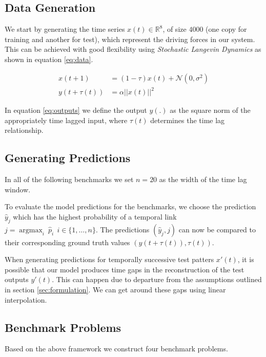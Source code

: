 \documentclass[envcountsect,runningheads]{llncs}
\theoremstyle{etoile}
\DeclareMathOperator*{\argmax}{argmax}
\begin{document}
\subsection{Data Generation}

We start by generating the time series $x(t) \in \mathbb{R}^8$, of size $4000$ 
(one copy for training and another for test), which represent the driving forces in our system. 
This can be achieved with good flexibility using \emph{Stochastic Langevin Dynamics} as shown in 
equation \ref{eq:data}.

\begin{align}
 x(t + 1) &= (1 - \tau) x(t) + \mathcal{N}(0, \sigma^2) \label{eq:data}\\
 y(t + \tau(t)) &= \alpha ||x(t)||^2 \label{eq:outputs}
\end{align}

In equation \ref{eq:outputs} we define the output $y(.)$ as the square norm of the appropriately 
time lagged input, where $\tau(t)$ determines the time lag relationship.

\subsection{Generating Predictions}

In all of the following benchmarks we set $n = 20$ as the width of the time lag window.

To evaluate the model predictions for the benchmarks, we choose the 
prediction $\hat{y}_j$ which has the highest probability of a temporal link 
$j = {\argmax}_{i} \ \hat{p}_i \ \ i \in \{1,\ldots,n\}$. The predictions 
$(\hat{y}_j, j)$ can now be compared to their corresponding ground truth values 
$(y(t + \tau(t)), \tau(t))$. 

When generating predictions for temporally successive test patters $x'(t)$, it is possible that our 
model produces time gaps in the reconstruction of the test outputs $y'(t)$. This can happen due to 
departure from the assumptions outlined in section \ref{sec:formulation}. We can get around these 
gaps using linear interpolation.


\subsection{Benchmark Problems}\label{sec:benchmark}

Based on the above framework we construct four benchmark problems.
\end{document}
